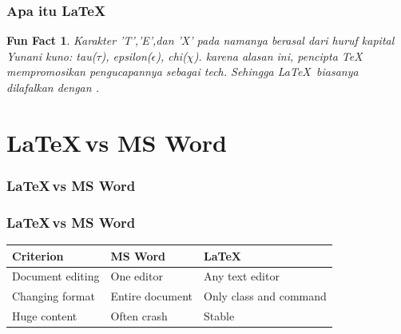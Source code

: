 \documentclass[aspectratio=169,10pt]{beamer}
\newtheorem{funfact}{Fun Fact}
\begin{document}
\begin{frame}
    \frametitle{Apa itu \LaTeX}
    \begin{funfact}
        Karakter 'T','E',dan 'X' pada namanya berasal dari huruf kapital Yunani 
        kuno: tau($\tau$), epsilon($\epsilon$), chi($\chi$). karena alasan ini, 
        pencipta TeX mempromosikan pengucapannya sebagai \color{blue}tech\color{black}.
        Sehingga \LaTeX$\,$ biasanya dilafalkan dengan \color{blue}{lah-tech}\color{black}.
    \end{funfact}
\end{frame}

\section{\LaTeX$\,$vs MS Word} 
\begin{frame}
    \frametitle{\LaTeX$\,$vs MS Word}
    \begin{center}
    \end{center}
\end{frame}

\begin{frame}
    \frametitle{\LaTeX$\,$vs MS Word}
    \begin{tabularx}{\textwidth}{X||X|X}
    \textbf{Criterion}&\textbf{MS Word} & \textbf{\LaTeX} \\
      \hline
      Document editing&One editor&Any text editor\\
      Changing format&Entire document& Only class and command\\
      Huge content&Often crash& Stable\\
      \end{tabularx}
\end{frame}
\end{document}
